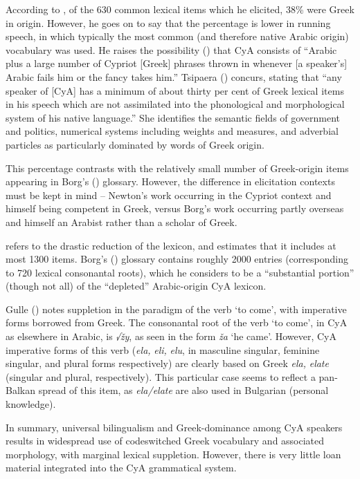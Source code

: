 \documentclass[output=paper]{langsci/langscibook}
\begin{document}
According to \citet{Newton1964}, of the 630 common lexical items which he elicited, 38\% were Greek in origin. However, he goes on to say that the percentage is lower in running speech, in which typically the most common (and therefore native Arabic origin) vocabulary was used. He raises the possibility (\citeyear[51]{Newton1964}) that CyA consists of “Arabic plus a large number of Cypriot [Greek] phrases thrown in whenever [a speaker’s] Arabic fails him or the fancy takes him.” Tsipaera (\citeyear[124]{Tsiapera1964}) concurs, stating that “any speaker of [CyA] has a minimum of about thirty per cent of Greek lexical items in his speech which are not assimilated into the phonological and morphological system of his native language.” She identifies the semantic fields of government and politics, numerical systems including weights and measures, and adverbial particles as particularly dominated by words of Greek origin. 

This percentage contrasts with the relatively small number of Greek-origin items appearing in Borg's (\citeyear{Borg2004}) glossary. However, the difference in elicitation contexts must be kept in mind – Newton’s work occurring in the Cypriot context and himself being competent in Greek, versus Borg’s work occurring partly overseas and himself an Arabist rather than a scholar of Greek.

\citet{Roth2004} refers to the drastic reduction of the lexicon, and estimates that it includes at most 1300 items. Borg's (\citeyear{Borg2004}) glossary contains roughly 2000 entries (corresponding to 720 lexical consonantal roots), which he considers to be a “substantial portion” (though not all) of the “depleted” Arabic-origin CyA lexicon. 

Gulle (\citeyear[45]{Gulle2016}) notes suppletion in the paradigm of the verb ‘to come’, with imperative forms borrowed from Greek. The consonantal root of the verb ‘to come’, in CyA as elsewhere in Arabic, is \textit{√žy}, as seen in the form \textit{ža} ‘he came’. However, CyA imperative forms of this verb (\textit{ela,} \textit{eli,} \textit{elu}, in masculine singular, feminine singular, and plural forms respectively) are clearly based on Greek \textit{ela,} \textit{elate} (singular and plural, respectively). This particular case seems to reflect a pan-Balkan spread of this item, as \textit{ela/elate} are also used in Bulgarian (personal knowledge). 

In summary, universal bilingualism and Greek-dominance among CyA speakers results in widespread use of codeswitched Greek vocabulary and associated morphology, with marginal lexical suppletion. However, there is very little loan material integrated into the CyA grammatical system.
\end{document}
